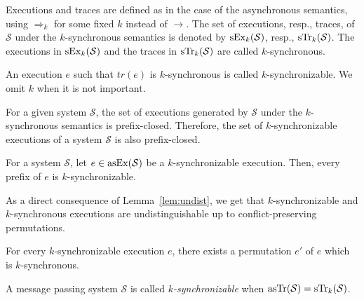 Executions and traces are defined as in the case of the asynchronous semantics, using $\Rightarrow_k$ for some fixed $k$ instead of $\rightarrow$. The set of executions, resp., traces, of $\mathcal{S}$ under the $k$-synchronous semantics is denoted by $\synchExec{\mathcal{S}}{k}$, resp., $\synchTr{\mathcal{S}}{k}$. The executions in $\synchExec{\mathcal{S}}{k}$ and the traces in 
$\synchTr{\mathcal{S}}{k}$ are called $k$-synchronous. 

An execution $e$ such that $tr(e)$ is $k$-synchronous is called $k$-synchronizable. We omit $k$ when it is not important. 

For a given system $\mathcal{S}$, the set of executions generated by $\mathcal{S}$ under the $k$-synchronous semantics is prefix-closed. Therefore, the set of $k$-synchronizable executions of a system $\mathcal{S}$ is also prefix-closed.

\begin{lemma}\label{lem:pref_closed}
For a system $\mathcal{S}$, let $e\in\asynchExec{\mathcal{S}}$ be a $k$-synchronizable execution. Then, every prefix of $e$ is $k$-synchronizable. 
\end{lemma}

As a direct consequence of Lemma~\ref{lem:undist}, we get that $k$-synchronizable and $k$-synchronous executions are undistinguishable up to conflict-preserving permutations.

\begin{lemma}\label{lem:zable_nous}
For every $k$-synchronizable execution $e$, there exists a permutation $e'$ of $e$ which is $k$-synchronous.
\end{lemma}


\begin{definition}\label{def:synchron}
A message passing system $\mathcal{S}$ is called \emph{$k$-synchronizable} when $\asynchTr{\mathcal{S}}=\synchTr{\mathcal{S}}{k}$.
\end{definition}


